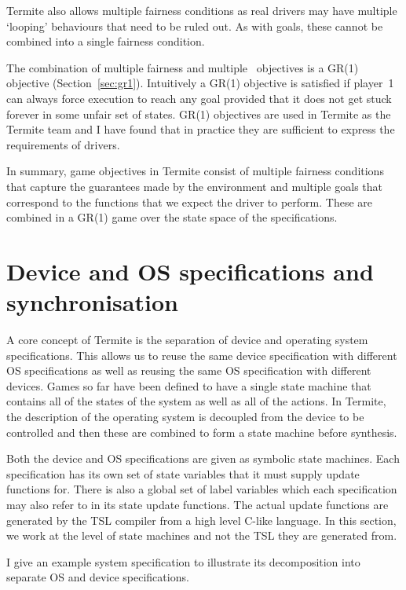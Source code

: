 Termite also allows multiple fairness conditions as real drivers may have multiple `looping' behaviours that need to be ruled out. As with goals, these cannot be combined into a single fairness condition.

The combination of multiple fairness and multiple \buchi\ objectives is a GR(1) objective (Section~\ref{sec:gr1}). Intuitively a GR(1) objective is satisfied if player~1 can always force execution to reach any goal provided that it does not get stuck forever in some unfair set of states. GR(1) objectives are used in Termite as the Termite team and I have found that in practice they are sufficient to express the requirements of drivers. 

In summary, game objectives in Termite consist of multiple fairness conditions that capture the guarantees made by the environment and multiple goals that correspond to the functions that we expect the driver to perform. These are combined in a GR(1) game over the state space of the specifications.

\section{Device and OS specifications and synchronisation}
\label{sec:composition}

A core concept of Termite is the separation of device and operating system specifications. This allows us to reuse the same device specification with different OS specifications as well as reusing the same OS specification with different devices. Games so far have been defined to have a single state machine that contains all of the states of the system as well as all of the actions. In Termite, the description of the operating system is decoupled from the device to be controlled and then these are combined to form a state machine before synthesis.

Both the device and OS specifications are given as symbolic state machines. Each specification has its own set of state variables that it must supply update functions for. There is also a global set of label variables which each specification may also refer to in its state update functions. The actual update functions are generated by the TSL compiler from a high level C-like language. In this section, we work at the level of state machines and not the TSL they are generated from.

I give an example system specification to illustrate its decomposition into separate OS and device specifications. 

